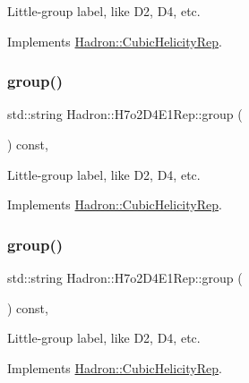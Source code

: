Little-\/group label, like D2, D4, etc. 

Implements \mbox{\hyperlink{structHadron_1_1CubicHelicityRep_a101a7d76cd8ccdad0f272db44b766113}{Hadron\+::\+Cubic\+Helicity\+Rep}}.

\mbox{\label{structHadron_1_1H7o2D4E1Rep_ad2f4770cf61bbb361907c5347106cf14}} 
\subsubsection{\texorpdfstring{group()}{group()}\hspace{0.1cm}{\footnotesize\ttfamily [2/3]}}
{\footnotesize\ttfamily std\+::string Hadron\+::\+H7o2\+D4\+E1\+Rep\+::group (\begin{DoxyParamCaption}{ }\end{DoxyParamCaption}) const\hspace{0.3cm}{\ttfamily [inline]}, {\ttfamily [virtual]}}

Little-\/group label, like D2, D4, etc. 

Implements \mbox{\hyperlink{structHadron_1_1CubicHelicityRep_a101a7d76cd8ccdad0f272db44b766113}{Hadron\+::\+Cubic\+Helicity\+Rep}}.

\mbox{\label{structHadron_1_1H7o2D4E1Rep_ad2f4770cf61bbb361907c5347106cf14}} 
\subsubsection{\texorpdfstring{group()}{group()}\hspace{0.1cm}{\footnotesize\ttfamily [3/3]}}
{\footnotesize\ttfamily std\+::string Hadron\+::\+H7o2\+D4\+E1\+Rep\+::group (\begin{DoxyParamCaption}{ }\end{DoxyParamCaption}) const\hspace{0.3cm}{\ttfamily [inline]}, {\ttfamily [virtual]}}

Little-\/group label, like D2, D4, etc. 

Implements \mbox{\hyperlink{structHadron_1_1CubicHelicityRep_a101a7d76cd8ccdad0f272db44b766113}{Hadron\+::\+Cubic\+Helicity\+Rep}}.

